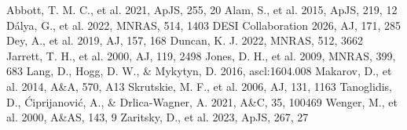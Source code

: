 \documentclass{aastex701}
\begin{document}
\begin{thebibliography}{}
 Abbott, T. M. C., et al. 2021, ApJS, 255, 20
 Alam, S., et al. 2015, ApJS, 219, 12
 D\'alya, G., et al. 2022, MNRAS, 514, 1403
 DESI Collaboration 2026, AJ, 171, 285
 Dey, A., et al. 2019, AJ, 157, 168
 Duncan, K. J. 2022, MNRAS, 512, 3662
 Jarrett, T. H., et al. 2000, AJ, 119, 2498
 Jones, D. H., et al. 2009, MNRAS, 399, 683
 Lang, D., Hogg, D. W., \& Mykytyn, D. 2016, ascl:1604.008
 Makarov, D., et al. 2014, A\&A, 570, A13
 Skrutskie, M. F., et al. 2006, AJ, 131, 1163
 Tanoglidis, D., \'Ciprijanovi\'c, A., \& Drlica-Wagner, A. 2021, A\&C, 35, 100469
 Wenger, M., et al. 2000, A\&AS, 143, 9
 Zaritsky, D., et al. 2023, ApJS, 267, 27
\end{thebibliography}
\end{document}
